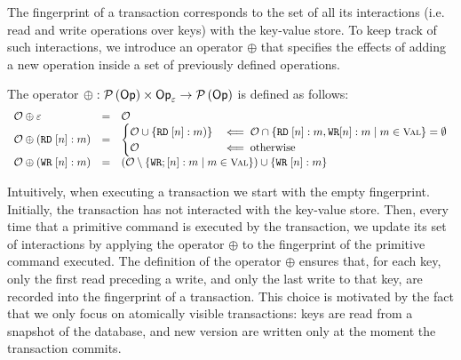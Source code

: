 The fingerprint of a transaction corresponds to the set of all its interactions (i.e. read and write operations over keys) 
with the  key-value store. To keep track of such interactions, we introduce an operator 
$\oplus$ that specifies the effects of adding a new operation inside 
a set of previously defined operations. 
\begin{definition}
\label{def:fingerprint.operator}
The operator $\oplus : \mathcal{P}\left(\mathsf{Op}\right) \times \mathsf{Op}_{\varepsilon} \rightarrow \mathcal{P}\left(\mathsf{Op}\right)$ is defined as follows: 
\[
\begin{array}{lcl}
\mathcal{O} \oplus \varepsilon &=& \mathcal{O}\\
\mathcal{O} \oplus (\RD\;[n]: m) &=&
\begin{cases}
\mathcal{O} \cup \{\RD\; [n]: m)\} & \impliedby \mathcal{O} \cap \{ \RD\;[n]: m, \WR [n]: m \mid m \in \Val\} = \emptyset\\
\mathcal{O} & \impliedby \text{otherwise}
\end{cases}\\
\mathcal{O} \oplus (\WR\;[n]: m) &=& 
(\mathcal{O} \setminus \{ \WR;[n] : m \mid m \in \Val \}) \cup \{\WR\;[n]: m \}
\end{array}
\]
\end{definition}
Intuitively, when executing a transaction we start with the empty fingerprint. Initially, the transaction has 
not interacted with the key-value store. Then, every time that a primitive command is executed by the 
transaction, we update its set of interactions by applying the operator $\oplus$ to the fingerprint of the  primitive
command executed. The definition of the operator $\oplus$ ensures that, for each key, only the first read preceding a 
write, and only the last write to that key, are recorded into the fingerprint of a transaction. This choice is motivated 
by the fact that we only focus on atomically visible transactions: keys are read from a snapshot of the 
database, and new version are written only at the moment the transaction commits. 

